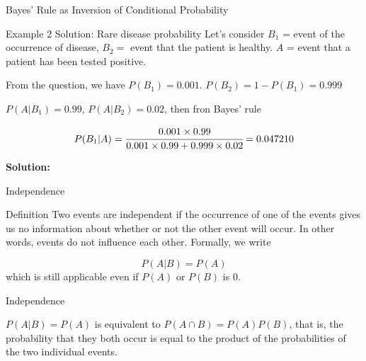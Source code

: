 \documentclass[aspectratio=169,xcolor=dvipsnames,svgnames,x11names,fleqn]{beamer}
\newcommand{\showanswers}{yes}
\begin{document}
\begin{frame}[containsverbatim]{Bayes' Rule as Inversion of Conditional Probability}
    \ifthenelse{\equal{\showanswers}{yes}}
    {
    \begin{examplesolution}{Example 2 Solution: Rare disease probability}
        Let's consider $B_1$ = event of the occurrence of disease, $B_2 = $ event that the patient is healthy.
        $A$ = event that a patient has been tested positive.
    
        From the question, we have $P(B_1) = 0.001$.
        $P(B_2) = 1  - P(B_1) = 0.999$
    
        $P(A|B_1) = 0.99$, $P(A|B_2) = 0.02$, then fron Bayes' rule
    
        \begin{equation}
            P(B_1 | A) = \cfrac{0.001 \times 0.99}{0.001 \times 0.99 + 0.999\times 0.02} = 0.047210
        \end{equation}
    \end{examplesolution}    
    }{
        \textbf{Solution:} \color{LightGray}{Blank space for calculation}
    }
    \end{frame}
    
    
    \begin{frame}[containsverbatim]{Independence}
        \begin{tblock}{Definition}
            Two events are independent if the occurrence of one of the events gives us no information about whether or not the other event will occur. In other words, events do not influence each other. Formally, we write
    
            \begin{equation}
                P(A|B) = P(A)
            \end{equation}
            which is still applicable even if $P(A)$ or $P(B)$ is 0.
        \end{tblock}

    \end{frame}
    
    
    \begin{frame}[containsverbatim]{Independence}
    
        $P(A|B) = P(A)$ is equivalent to $P(A \cap B) =  P(A)P(B)$, that is, the probability that they both occur is equal to the product of the probabilities of the two individual events.

    \end{frame}
    
\end{document}
